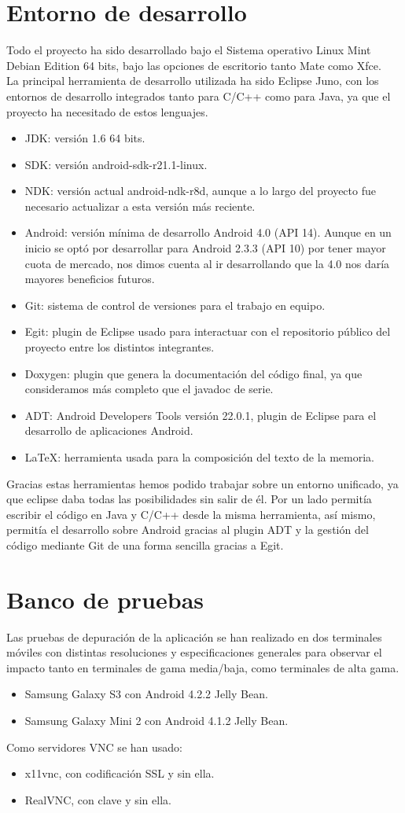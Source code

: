 \section{Entorno de desarrollo}
Todo el proyecto ha sido desarrollado bajo el Sistema operativo Linux Mint Debian Edition 64 bits, bajo las opciones de escritorio tanto Mate como Xfce.\\

La principal herramienta de desarrollo utilizada ha sido Eclipse Juno, con los entornos de desarrollo integrados tanto para C/C++ como para Java, ya que el proyecto ha necesitado de estos lenguajes.
\begin{itemize}
\item JDK: versión 1.6 64 bits.
\item SDK: versión android-sdk-r21.1-linux.
\item NDK: versión actual android-ndk-r8d, aunque a lo largo del proyecto fue necesario actualizar a esta versión más reciente.
\item Android: versión mínima de desarrollo Android 4.0 (API 14). Aunque en un inicio se optó por desarrollar para Android 2.3.3 (API 10) por tener mayor cuota de mercado, nos dimos cuenta al ir desarrollando que la 4.0 nos daría mayores beneficios futuros.
\item Git: sistema de control de versiones para el trabajo en equipo.
\item Egit: plugin de Eclipse usado para interactuar con el repositorio público del proyecto entre los distintos integrantes.
\item Doxygen: plugin que genera la documentación del código final, ya que consideramos más completo que el javadoc de serie.
\item ADT: Android Developers Tools versión 22.0.1, plugin de Eclipse para el desarrollo de aplicaciones Android.
\item LaTeX: herramienta usada para la composición del texto de la memoria.
\end{itemize}

Gracias estas herramientas hemos podido trabajar sobre un entorno unificado, ya que eclipse daba todas las posibilidades sin salir de él. Por un lado permitía escribir el código en Java y C/C++ desde la misma herramienta, así mismo, permitía el desarrollo sobre Android gracias al plugin ADT y la gestión del código mediante Git de una forma sencilla gracias a Egit. 



\newpage
\section{Banco de pruebas}
Las pruebas de depuración de la aplicación se han realizado en dos terminales móviles con distintas resoluciones y especificaciones generales para observar el impacto tanto en terminales de gama media/baja, como terminales de alta gama.
\begin{itemize}
\item Samsung Galaxy S3 con Android 4.2.2 Jelly Bean.
\item Samsung Galaxy Mini 2 con Android 4.1.2 Jelly Bean.
\end{itemize}

Como servidores VNC se han usado:
\begin{itemize}
\item x11vnc, con codificación SSL y sin ella.
\item RealVNC, con clave y sin ella.
\end{itemize}
